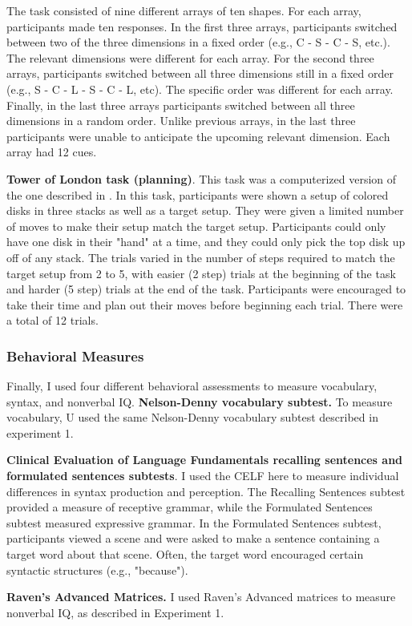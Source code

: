 \documentclass[../dissertation.tex]{subfiles}
\begin{document}
The task consisted of nine different arrays of ten shapes. For each array, participants made ten responses. In the first three arrays, participants switched between two of the three dimensions in a fixed order (e.g., C - S - C - S, etc.). The relevant dimensions were different for each array. For the second three arrays, participants switched between all three dimensions still in a fixed order (e.g., S - C - L - S - C - L, etc). The specific order was different for each array. Finally, in the last three arrays participants switched between all three dimensions in a random order. Unlike previous arrays, in the last three participants were unable to anticipate the upcoming relevant dimension. Each array had 12 cues. \par
\textbf{Tower of London task (planning)}. This task was a computerized version of the one described in \citet{Shallice1982}. In this task, participants were shown a setup of colored disks in three stacks as well as a target setup. They were given a limited number of moves to make their setup match the target setup. Participants could only have one disk in their "hand" at a time, and they could only pick the top disk up off of any stack. The trials varied in the number of steps required to match the target setup from 2 to 5, with easier (2 step) trials at the beginning of the task and harder (5 step) trials at the end of the task. Participants were encouraged to take their time and plan out their moves before beginning each trial. There were a total of 12 trials.

\subsubsection{Behavioral Measures} 
Finally, I used four different behavioral assessments to measure vocabulary, syntax, and nonverbal IQ.
\textbf{Nelson-Denny vocabulary subtest.} To measure vocabulary, U used the same Nelson-Denny vocabulary subtest described in experiment 1. \par
\textbf{Clinical Evaluation of Language Fundamentals recalling sentences and formulated sentences subtests}. I used the CELF here to measure individual differences in syntax production and perception. The Recalling Sentences subtest provided a measure of receptive grammar, while the Formulated Sentences subtest measured expressive grammar. In the Formulated Sentences subtest, participants viewed a scene and were asked to make a sentence containing a target word about that scene. Often, the target word encouraged certain syntactic structures (e.g., "because"). \par
\textbf{Raven's Advanced Matrices.} I used Raven's Advanced matrices to measure nonverbal IQ, as described in Experiment 1.
\end{document}
